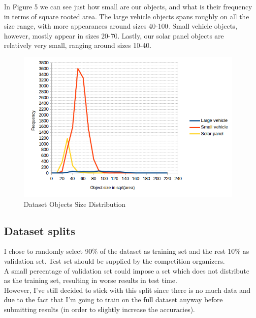 \documentclass[]{article}
\begin{document}
In Figure 5 we can see just how small are our objects, and what is their frequency in terms of square rooted area. The large vehicle objects spans roughly on all the size range, with more appearances around sizes 40-100. Small vehicle objects, however, mostly appear in sizes 20-70. Lastly, our solar panel objects are relatively very small, ranging around sizes 10-40.
\begin{figure}[!h]
\centering
\includegraphics[width=0.7\linewidth]{"charts/Dataset Objects Size Distribution"}
\caption{Dataset Objects Size Distribution}
\label{fig:Dataset Objects Size Distribution}
\end{figure}

\subsection{Dataset splits}
I chose to randomly select 90\% of the dataset as training set and the rest 10\% as validation set. Test set should be supplied by the competition organizers.\\
A small percentage of validation set could impose a set which does not distribute as the training set, resulting in worse results in test time.\\
However, I've still decided to stick with this split since there is no much data and due to the fact that I'm going to train on the full dataset anyway before submitting results (in order to slightly increase the accuracies).
\end{document}
